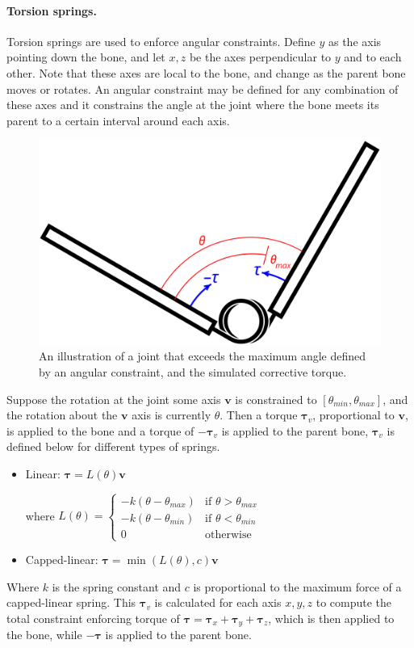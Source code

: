 \documentclass[10pt,twocolumn,letterpaper]{article}
\begin{document}
\paragraph{Torsion springs.} Torsion springs are used to enforce angular constraints. Define $y$ as the axis pointing down the bone, and let $x, z$ be the axes perpendicular to $y$ and to each other. Note that these axes are local to the bone, and change as the parent bone moves or rotates. An angular constraint may be defined for any combination of these axes and it constrains the angle at the joint where the bone meets its parent to a certain interval around each axis. 

\begin{figure}[]
    \centering
    \includegraphics[width=0.7\columnwidth] {diagram6.png}
    \caption{An illustration of a joint that exceeds the maximum angle defined by an angular constraint, and the simulated corrective torque.}
    \label{img:cp-spring}
\end{figure}

Suppose the rotation at the joint some axis $\bm{v}$ is constrained to $[\theta_{min}, \theta_{max}]$, and the rotation about the $\bm{v}$ axis is currently $\theta$. Then a torque $\bm{\tau}_v$, proportional to $\bm{v}$, is applied to the bone and a torque of $-\bm{\tau}_v$ is applied to the parent bone, $\bm{\tau}_v$ is defined below for different types of springs.
\begin{itemize}
\item Linear: $\bm{\tau} = L(\theta) \bm{v} $ 

where $L(\theta) = \begin{cases} -k (\theta - \theta_{max}) & \text{if } \theta > \theta_{max} \\  -k (\theta - \theta_{min}) & \text{if } \theta < \theta_{min} \\ 0 & \text{otherwise} \end{cases}$

\item Capped-linear: $\bm{\tau} = \min(L(\theta), c) \bm{v} $ 
\end{itemize}
Where $k$ is the spring constant and $c$ is proportional to the maximum force of a capped-linear spring. This $\bm{\tau}_v$ is calculated for each axis $x, y, z$ to compute the total constraint enforcing torque of $\bm{\tau} = \bm{\tau}_x + \bm{\tau}_y + \bm{\tau}_z$, which is then applied to the bone, while $-\bm{\tau}$ is applied to the parent bone.
\end{document}
